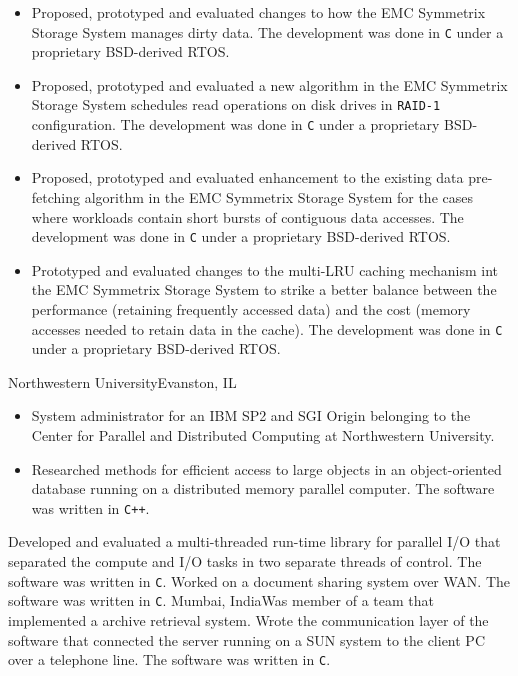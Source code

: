 {
	\begin{itemize}
		\item Proposed, prototyped and evaluated changes to how the EMC Symmetrix Storage System manages dirty data.
			The development was done in \texttt{C} under a proprietary BSD-derived RTOS.
		\item Proposed, prototyped and evaluated a new algorithm in the EMC Symmetrix Storage System schedules read
			operations on disk drives in \texttt{RAID-1} configuration.
			The development was done in \texttt{C} under a proprietary BSD-derived RTOS.
		\item Proposed, prototyped and evaluated enhancement to the existing data pre-fetching algorithm
			in the EMC Symmetrix Storage System for the cases where workloads contain short bursts of 
			contiguous data accesses. The development was done in \texttt{C} under a proprietary BSD-derived RTOS.
		\item Prototyped and evaluated changes to the multi-LRU caching mechanism int the EMC Symmetrix Storage
			System to strike a better balance between the performance (retaining frequently accessed data) and the cost
			(memory accesses needed to retain data in the cache).
			The development was done in \texttt{C} under a proprietary BSD-derived RTOS.
	\end{itemize}
}
{Northwestern University}{Evanston, IL}
{\begin{itemize}
	\item System administrator for an IBM SP2 and SGI Origin belonging to the 
		Center for Parallel and Distributed Computing at Northwestern University.
	\item Researched methods for efficient access to large objects in an object-oriented
		database running on a distributed memory parallel computer. The
		software was written in \texttt{C++}.
	\end{itemize}}
{Developed and evaluated a multi-threaded run-time library for parallel I/O that
separated the compute and I/O tasks in two separate threads of control. The
software was written in \texttt{C}.}
{Worked on a document sharing system over WAN. The software was written in \texttt{C}.}
{Mumbai, India}{}{Was member of a team that implemented a archive retrieval system.
Wrote the communication layer of the software that connected the server running
on a SUN system to the client PC over a telephone line. The software was
written in \texttt{C}.}

